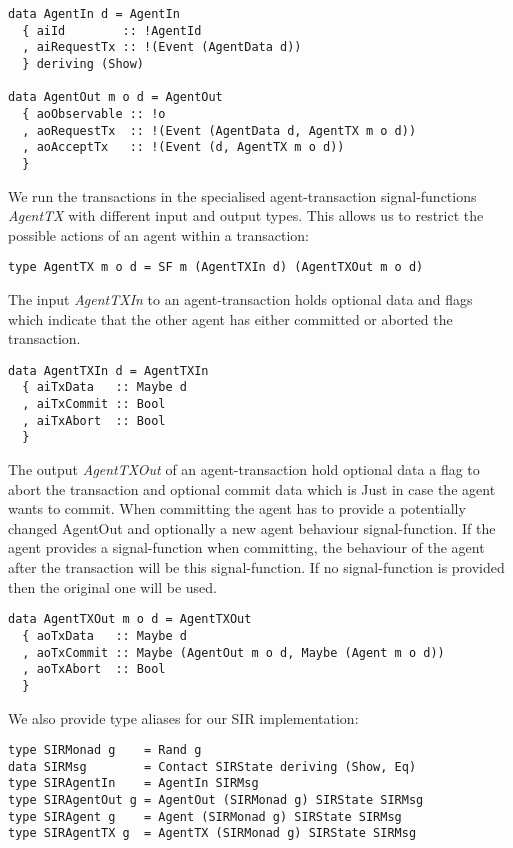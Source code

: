 \begin{verbatim}
data AgentIn d = AgentIn
  { aiId        :: !AgentId
  , aiRequestTx :: !(Event (AgentData d))
  } deriving (Show)

data AgentOut m o d = AgentOut
  { aoObservable :: !o
  , aoRequestTx  :: !(Event (AgentData d, AgentTX m o d))
  , aoAcceptTx   :: !(Event (d, AgentTX m o d))
  }
\end{verbatim}

We run the transactions in the specialised agent-transaction signal-functions \textit{AgentTX} with different input and output types. This allows us to restrict the possible actions of an agent within a transaction:

\begin{verbatim}
type AgentTX m o d = SF m (AgentTXIn d) (AgentTXOut m o d)
\end{verbatim}

The input \textit{AgentTXIn} to an agent-transaction holds optional data and flags which indicate that the other agent has either committed or aborted the transaction.

\begin{verbatim}
data AgentTXIn d = AgentTXIn
  { aiTxData   :: Maybe d
  , aiTxCommit :: Bool
  , aiTxAbort  :: Bool
  }
\end{verbatim}

The output \textit{AgentTXOut} of an agent-transaction hold optional data a flag to abort the transaction and optional commit data which is Just in case the agent wants to commit. When committing the agent has to provide a potentially changed AgentOut and optionally a new agent behaviour signal-function. If the agent provides a signal-function when committing, the behaviour of the agent after the transaction will be this signal-function. If no signal-function is provided then the original one will be used.

\begin{verbatim}
data AgentTXOut m o d = AgentTXOut
  { aoTxData   :: Maybe d
  , aoTxCommit :: Maybe (AgentOut m o d, Maybe (Agent m o d))
  , aoTxAbort  :: Bool
  }
\end{verbatim}

We also provide type aliases for our SIR implementation:
\begin{verbatim}
type SIRMonad g    = Rand g
data SIRMsg        = Contact SIRState deriving (Show, Eq)
type SIRAgentIn    = AgentIn SIRMsg
type SIRAgentOut g = AgentOut (SIRMonad g) SIRState SIRMsg
type SIRAgent g    = Agent (SIRMonad g) SIRState SIRMsg
type SIRAgentTX g  = AgentTX (SIRMonad g) SIRState SIRMsg
\end{verbatim}

